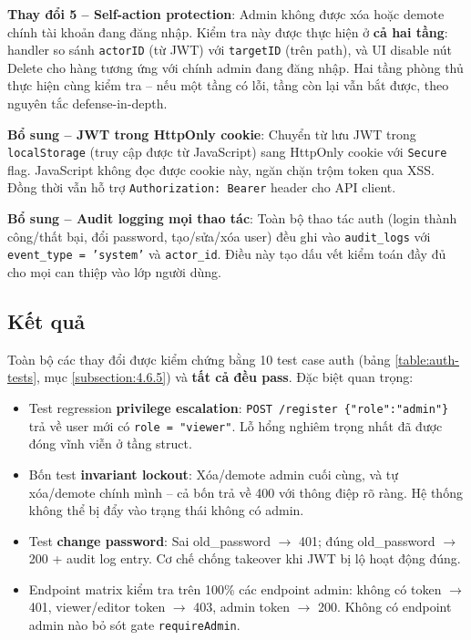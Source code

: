 \documentclass[../DoAn.tex]{subfiles}
\begin{document}
\textbf{Thay đổi 5 -- Self-action protection}: Admin không được xóa hoặc
demote chính tài khoản đang đăng nhập. Kiểm tra này được thực hiện ở
\textbf{cả hai tầng}: handler so sánh \texttt{actorID} (từ JWT) với
\texttt{targetID} (trên path), và UI disable nút Delete cho hàng tương ứng
với chính admin đang đăng nhập. Hai tầng phòng thủ thực hiện cùng kiểm
tra -- nếu một tầng có lỗi, tầng còn lại vẫn bắt được, theo nguyên tắc
defense-in-depth.

\textbf{Bổ sung -- JWT trong HttpOnly cookie}: Chuyển từ lưu JWT trong
\texttt{localStorage} (truy cập được từ JavaScript) sang HttpOnly cookie
với \texttt{Secure} flag. JavaScript không đọc được cookie này, ngăn chặn
trộm token qua XSS. Đồng thời vẫn hỗ trợ \texttt{Authorization: Bearer}
header cho API client.

\textbf{Bổ sung -- Audit logging mọi thao tác}: Toàn bộ thao tác auth
(login thành công/thất bại, đổi password, tạo/sửa/xóa user) đều ghi vào
\texttt{audit\_logs} với \texttt{event\_type = 'system'} và
\texttt{actor\_id}. Điều này tạo dấu vết kiểm toán đầy đủ cho mọi can
thiệp vào lớp người dùng.

\subsection{Kết quả}
\label{subsection:5.5.3}

Toàn bộ các thay đổi được kiểm chứng bằng 10 test case auth (bảng
\ref{table:auth-tests}, mục \ref{subsection:4.6.5}) và \textbf{tất cả đều
pass}. Đặc biệt quan trọng:

\begin{itemize}[leftmargin=*]
    \item Test regression \textbf{privilege escalation}: \texttt{POST /register
    \{"role":"admin"\}} trả về user mới có \texttt{role = "viewer"}. Lỗ
    hổng nghiêm trọng nhất đã được đóng vĩnh viễn ở tầng struct.

    \item Bốn test \textbf{invariant lockout}: Xóa/demote admin cuối cùng,
    và tự xóa/demote chính mình -- cả bốn trả về 400 với thông điệp rõ
    ràng. Hệ thống không thể bị đẩy vào trạng thái không có admin.

    \item Test \textbf{change password}: Sai old\_password \(\to\) 401;
    đúng old\_password \(\to\) 200 + audit log entry. Cơ chế chống takeover
    khi JWT bị lộ hoạt động đúng.

    \item Endpoint matrix kiểm tra trên 100\% các endpoint admin: không
    có token \(\to\) 401, viewer/editor token \(\to\) 403, admin token
    \(\to\) 200. Không có endpoint admin nào bỏ sót gate \texttt{requireAdmin}.
\end{itemize}
\end{document}
